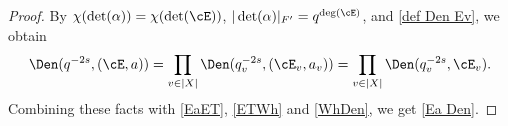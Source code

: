 \begin{proof}
By $\chi(\det(\alpha))=\chi(\det(\cE))$, $|\det (\alpha)|_{F'}=q^{\deg(\cE)}$, and \eqref{def Den Ev}, we obtain
\begin{equation*}
\Den(q^{-2s}, (\cE,a))=\prod_{v\in |X|}\Den(q^{-2s}_{v}, (\cE_{v},a_{v}))=\prod_{v\in |X|}\Den(q_v^{-2s},  \cE_{v}).
\end{equation*}
Combining these facts with \eqref{EaET}, \eqref{ETWh} and \eqref{WhDen}, we get \eqref{Ea Den}.


%



\end{proof}
